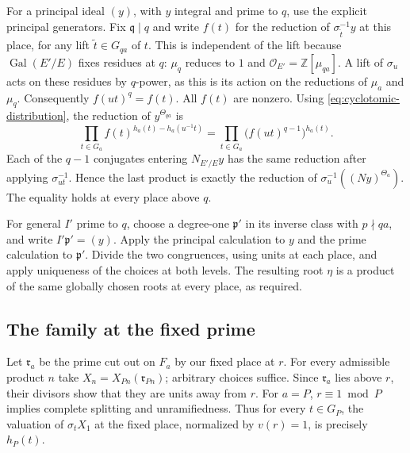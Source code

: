 For a principal ideal \((y)\), with \(y\) integral and prime to
\(q\), use the explicit principal generators. Fix
\(\mathfrak q\mid q\) and write \(f(t)\) for the reduction of
\(\sigma_{\tilde t}^{-1}y\) at this place, for any lift
\(\tilde t\in G_{qa}\) of \(t\). This is independent of the lift
because \(\operatorname{Gal}(E'/E)\) fixes residues at \(q\):
\(\mu_q\) reduces to \(1\) and
\(\mathcal O_{E'}=\mathbb Z[\mu_{qa}]\). A lift of \(\sigma_u\)
acts on these residues by \(q\)-power, as this is its action on
the reductions of \(\mu_a\) and \(\mu_q\). Consequently
\(f(ut)^q=f(t)\). All \(f(t)\) are nonzero. Using
\eqref{eq:cyclotomic-distribution}, the reduction of
\(y^{\Theta_{qa}}\) is
\[
 \prod_{t\in G_a} f(t)^{h_a(t)-h_a(u^{-1}t)}
    =\prod_{t\in G_a}\big(f(ut)^{q-1}\big)^{h_a(t)}.
\]
Each of the \(q-1\) conjugates entering \(N_{E'/E}y\) has the
same reduction after applying \(\sigma_{ut}^{-1}\). Hence the
last product is exactly the reduction of
\(\sigma_u^{-1}((Ny)^{\Theta_a})\).
The equality holds at every place above \(q\).

For general \(I'\) prime to \(q\), choose a degree-one
\(\mathfrak p'\) in its inverse class with \(p\nmid qa\), and write
\(I'\mathfrak p'=(y)\). Apply the principal calculation to
\(y\) and the prime calculation to \(\mathfrak p'\). Divide
the two congruences, using units at each place, and apply uniqueness
of the choices at both levels. The resulting root \(\eta\) is a
product of the same globally chosen roots at every place, as required.

\subsection{The family at the fixed prime}

Let \(\mathfrak r_a\) be the prime cut out on \(F_a\) by our
fixed place at \(r\). For every admissible product \(n\) take
\(X_n=X_{Pn}(\mathfrak r_{Pn})\); arbitrary choices suffice.
Since \(\mathfrak r_{a}\) lies above \(r\), their divisors show
that they are units away from \(r\). For \(a=P\), \(r\equiv1\bmod P\)
implies complete splitting and unramifiedness. Thus for every
\(t\in G_P\), the valuation of \(\sigma_t X_1\) at the fixed
place, normalized by \(v(r)=1\), is precisely \(h_P(t)\).

